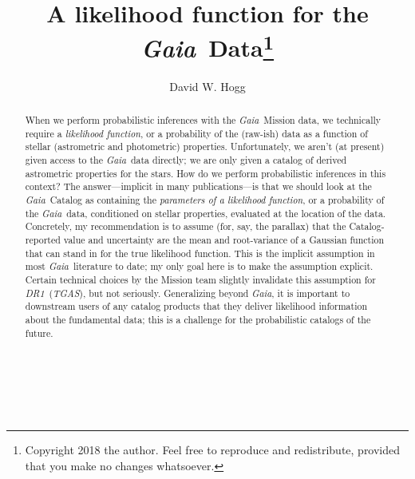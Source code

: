 \documentclass[12pt, modern]{aastex62}
\newcommand{\acronym}[1]{{\small{#1}}}
\newcommand{\Gaia}{\textsl{Gaia}}
\newcommand{\DRone}{\textsl{\acronym{DR1}}}
\newcommand{\TGAS}{\textsl{\acronym{TGAS}}}
\begin{document}
\sloppy\sloppypar\raggedbottom\frenchspacing

\noindent
\title{A likelihood function for the \Gaia\ Data\footnote{%
  Copyright 2018 the author. Feel free to reproduce and redistribute, provided
  that you make no changes whatsoever.}}

\author[0000-0003-2866-9403]{David W. Hogg}

\begin{abstract}\noindent
When we perform probabilistic inferences with the \Gaia\ Mission data,
we technically require
a \emph{likelihood function}, or a probability of the (raw-ish) data as a function
of stellar (astrometric and photometric) properties.
Unfortunately, we aren't (at present) given access to the \Gaia\ data
directly;
we are only given a catalog of derived astrometric properties for the stars.
How do we perform probabilistic inferences in this context?
The answer---implicit in many publications---is that we should look at the
\Gaia\ Catalog as containing the \emph{parameters of a likelihood function}, or
a probability of the \Gaia\ data, conditioned on stellar properties,
evaluated at the location of the data.
Concretely, my recommendation is to assume
(for, say, the parallax) that the Catalog-reported
value and uncertainty are the mean and root-variance of a Gaussian
function that can stand in for the true likelihood function.
This is the implicit assumption in most \Gaia\ literature to date;
my only goal here is to make the assumption explicit.
Certain technical choices by the Mission team slightly invalidate
this assumption for \DRone\ (\TGAS), but not seriously. Generalizing beyond \Gaia,
it is important to downstream users of any catalog products
that they deliver likelihood information about the fundamental data;
this is a challenge for the probabilistic catalogs of the future.
\end{abstract}


\section*{~}\clearpage
\end{document}
